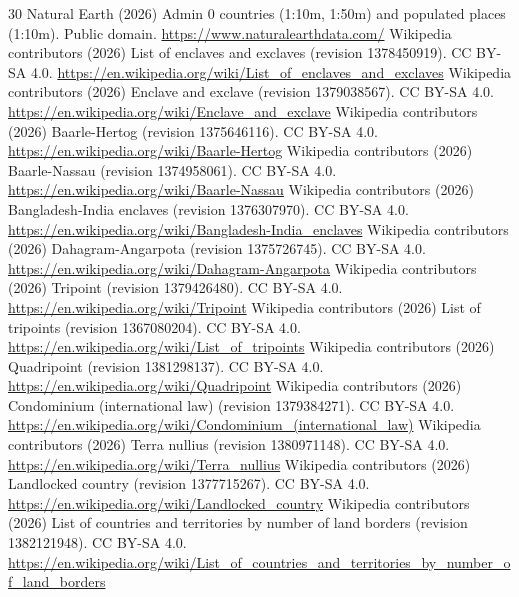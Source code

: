 \documentclass[11pt,a4paper]{article}
\begin{document}
\begin{thebibliography}{30}
 Natural Earth (2026) Admin 0 countries (1:10m, 1:50m) and populated places (1:10m). Public domain. \url{https://www.naturalearthdata.com/}
 Wikipedia contributors (2026) List of enclaves and exclaves (revision 1378450919). CC BY-SA 4.0. \url{https://en.wikipedia.org/wiki/List_of_enclaves_and_exclaves}
 Wikipedia contributors (2026) Enclave and exclave (revision 1379038567). CC BY-SA 4.0. \url{https://en.wikipedia.org/wiki/Enclave_and_exclave}
 Wikipedia contributors (2026) Baarle-Hertog (revision 1375646116). CC BY-SA 4.0. \url{https://en.wikipedia.org/wiki/Baarle-Hertog}
 Wikipedia contributors (2026) Baarle-Nassau (revision 1374958061). CC BY-SA 4.0. \url{https://en.wikipedia.org/wiki/Baarle-Nassau}
 Wikipedia contributors (2026) Bangladesh-India enclaves (revision 1376307970). CC BY-SA 4.0. \url{https://en.wikipedia.org/wiki/Bangladesh-India_enclaves}
 Wikipedia contributors (2026) Dahagram-Angarpota (revision 1375726745). CC BY-SA 4.0. \url{https://en.wikipedia.org/wiki/Dahagram-Angarpota}
 Wikipedia contributors (2026) Tripoint (revision 1379426480). CC BY-SA 4.0. \url{https://en.wikipedia.org/wiki/Tripoint}
 Wikipedia contributors (2026) List of tripoints (revision 1367080204). CC BY-SA 4.0. \url{https://en.wikipedia.org/wiki/List_of_tripoints}
 Wikipedia contributors (2026) Quadripoint (revision 1381298137). CC BY-SA 4.0. \url{https://en.wikipedia.org/wiki/Quadripoint}
 Wikipedia contributors (2026) Condominium (international law) (revision 1379384271). CC BY-SA 4.0. \url{https://en.wikipedia.org/wiki/Condominium_(international_law)}
 Wikipedia contributors (2026) Terra nullius (revision 1380971148). CC BY-SA 4.0. \url{https://en.wikipedia.org/wiki/Terra_nullius}
 Wikipedia contributors (2026) Landlocked country (revision 1377715267). CC BY-SA 4.0. \url{https://en.wikipedia.org/wiki/Landlocked_country}
 Wikipedia contributors (2026) List of countries and territories by number of land borders (revision 1382121948). CC BY-SA 4.0. \url{https://en.wikipedia.org/wiki/List_of_countries_and_territories_by_number_of_land_borders}

\end{thebibliography}
\end{document}
